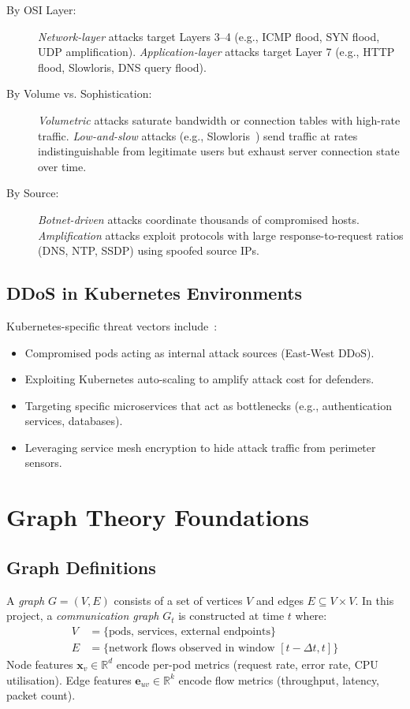 \begin{description}
  \item[By OSI Layer:]
    \textit{Network-layer} attacks target Layers 3--4 (e.g., ICMP flood, SYN flood,
    UDP amplification). \textit{Application-layer} attacks target Layer 7 (e.g., HTTP
    flood, Slowloris, DNS query flood).

  \item[By Volume vs. Sophistication:]
    \textit{Volumetric} attacks saturate bandwidth or connection tables with high-rate
    traffic. \textit{Low-and-slow} attacks (e.g., Slowloris~\cite{slowloris}) send traffic
    at rates indistinguishable from legitimate users but exhaust server connection state
    over time.

  \item[By Source:]
    \textit{Botnet-driven} attacks coordinate thousands of compromised hosts.
    \textit{Amplification} attacks exploit protocols with large response-to-request ratios
    (DNS, NTP, SSDP) using spoofed source IPs.
\end{description}

\subsection{DDoS in Kubernetes Environments}
Kubernetes-specific threat vectors include~\cite{k8s_security_2023}:
\begin{itemize}
  \item Compromised pods acting as internal attack sources (East-West DDoS).
  \item Exploiting Kubernetes auto-scaling to amplify attack cost for defenders.
  \item Targeting specific microservices that act as bottlenecks (e.g., authentication
  services, databases).
  \item Leveraging service mesh encryption to hide attack traffic from perimeter sensors.
\end{itemize}

\section{Graph Theory Foundations}
\label{sec:bg_graphs}

\subsection{Graph Definitions}
A \emph{graph} $G = (V, E)$ consists of a set of vertices $V$ and edges $E \subseteq
V \times V$. In this project, a \emph{communication graph} $G_t$ is constructed at time
$t$ where:
\begin{align}
  V &= \{\text{pods, services, external endpoints}\} \\
  E &= \{\text{network flows observed in window } [t-\Delta t, t]\}
\end{align}
Node features $\mathbf{x}_v \in \mathbb{R}^d$ encode per-pod metrics (request rate, error
rate, CPU utilisation). Edge features $\mathbf{e}_{uv} \in \mathbb{R}^k$ encode flow
metrics (throughput, latency, packet count).

